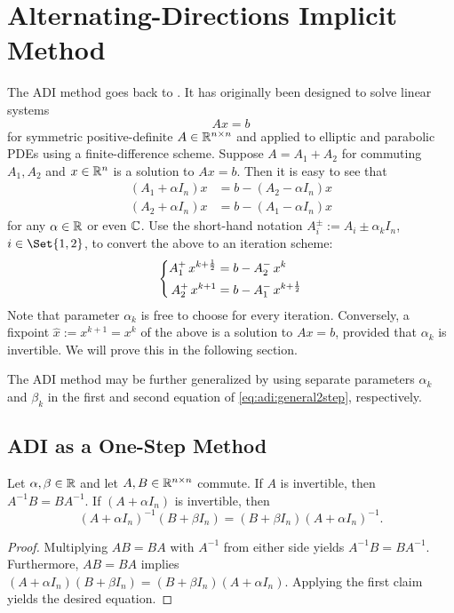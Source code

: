 \chapter{Alternating-Directions Implicit Method}

The \ac{ADI} method goes back to \cite{Peaceman1955}.
It has originally been designed to solve linear systems
\begin{equation}
  Ax = b
\end{equation}
for symmetric positive-definite $A\in\mathbb{R}^{n\times n}$
and applied to elliptic and parabolic \acp{PDE} using a finite-difference scheme.
Suppose $A=A_1+A_2$ for commuting $A_1, A_2$ and $x\in\mathbb{R}^n$ is a solution to $Ax=b$.
Then it is easy to see that
\begin{align*}
  (A_1 + \alpha I_n)x &= b - (A_2 - \alpha I_n) x \\
  (A_2 + \alpha I_n)x &= b - (A_1 - \alpha I_n) x
\end{align*}
for any $\alpha\in\mathbb{R}$ or even $\mathbb{C}$.
Use the short-hand notation $ A_i^\pm := A_i \pm \alpha_k I_n$,
$i\in\Set{1,2}$,
to convert the above to an iteration scheme:
\begin{equation}
  \label{eq:adi:general2step}
  \left\{
  \begin{aligned}
    \mathop{A_1^+}  x^{k+\frac{1}{2}} &= b - \mathop{A_2^-} x^k \\
    \mathop{A_2^+} x^{k+1}           &= b - \mathop{A_1^-} x^{k+\frac{1}{2}}
  \end{aligned}
  \right.
\end{equation}
Note that parameter $\alpha_k$ is free to choose for every iteration.
Conversely, a fixpoint $\hat x := x^{k+1} = x^k$ of the above is a solution to $Ax=b$,
provided that $\alpha_k$ is invertible.
We will prove this in the following section.

\begin{remark}
  The \ac{ADI} method may be further generalized by using separate parameters
  $\alpha_k$ and $\beta_k$ in the first and second equation of \eqref{eq:adi:general2step}, respectively.
\end{remark}

\section{ADI as a One-Step Method}

\begin{lemma}
\label{thm:adi:commuting-matrices}
  Let $\alpha, \beta\in\mathbb{R}$ and let $A, B \in\mathbb{R}^{n\times n}$ commute.
  If $A$ is invertible, then $A^{-1}B = BA^{-1}$.
  If $(A+\alpha I_n)$ is invertible, then
  \begin{equation*}
    (A+\alpha I_n)^{-1} (B+\beta I_n)
    =
    (B+\beta I_n) (A+\alpha I_n)^{-1}
    .
  \end{equation*}
\end{lemma}
\begin{proof}
  Multiplying $AB=BA$ with $A^{-1}$ from either side yields $A^{-1}B=BA^{-1}$.
  Furthermore, $AB=BA$ implies
  $
    (A+\alpha I_n) (B+\beta I_n)
    =
    (B+\beta I_n) (A+\alpha I_n)
  $.
  Applying the first claim yields the desired equation.
\end{proof}

